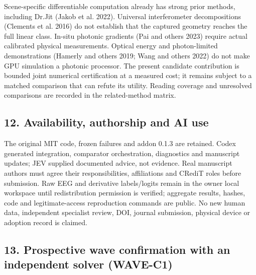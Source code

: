\documentclass[
  10pt,
]{article}
\begin{document}
Scene-specific differentiable computation already has strong prior
methods, including Dr.Jit (Jakob et al. 2022). Universal interferometer
decompositions (Clements et al. 2016) do not establish that the captured
geometry reaches the full linear class. In-situ photonic gradients (Pai
and others 2023) require actual calibrated physical measurements.
Optical energy and photon-limited demonstrations (Hamerly and others
2019; Wang and others 2022) do not make GPU simulation a photonic
processor. The present candidate contribution is bounded joint numerical
certification at a measured cost; it remains subject to a matched
comparison that can refute its utility. Reading coverage and unresolved
comparisons are recorded in the related-method matrix.

\hypertarget{availability-authorship-and-ai-use}{%
\subsection{12. Availability, authorship and AI
use}\label{availability-authorship-and-ai-use}}

The original MIT code, frozen failures and addon 0.1.3 are retained.
Codex generated integration, comparator orchestration, diagnostics and
manuscript updates; JEV supplied documented advice, not evidence. Real
manuscript authors must agree their responsibilities, affiliations and
CRediT roles before submission. Raw EEG and derivative labels/logits
remain in the owner local workspace until redistribution permission is
verified; aggregate results, hashes, code and legitimate-access
reproduction commands are public. No new human data, independent
specialist review, DOI, journal submission, physical device or adoption
record is claimed.

\hypertarget{prospective-wave-confirmation-with-an-independent-solver-wave-c1}{%
\subsection{13. Prospective wave confirmation with an independent solver
(WAVE-C1)}\label{prospective-wave-confirmation-with-an-independent-solver-wave-c1}}
\end{document}

